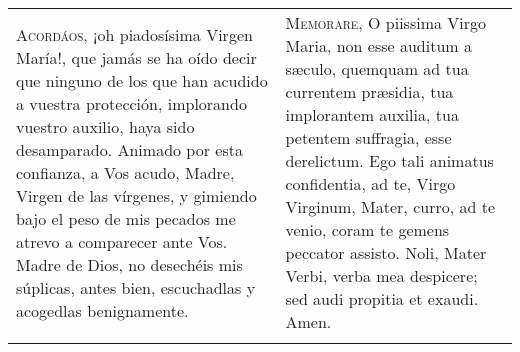 \documentclass[./00_main.tex]{subfiles}
\begin{document}
\begin{longtable} { p{} p{} }
    \label{memorare}
    \textsc{Acordáos}, ¡oh piadosísima Virgen María!, que jamás se ha oído decir que ninguno de los que han acudido a vuestra protección, 
    implorando vuestro auxilio, haya sido desamparado. Animado por esta confianza, a Vos acudo, Madre, Virgen de las vírgenes, y gimiendo 
    bajo el peso de mis pecados me atrevo a comparecer ante Vos. Madre de Dios, no desechéis mis súplicas, antes bien, escuchadlas y 
    acogedlas benignamente.
        &
    \textsc{Memorare}, O piissima Virgo Maria, non esse auditum a s{\ae}culo, quemquam ad tua currentem pr{\ae}sidia, tua implorantem auxilia, 
    tua petentem suffragia, esse derelictum. Ego tali animatus confidentia, ad te, Virgo Virginum, Mater, curro, ad te venio, coram te gemens 
    peccator assisto. Noli, Mater Verbi, verba mea despicere; sed audi propitia et exaudi. Amen.\\\\
    

\end{longtable}
\end{document}
